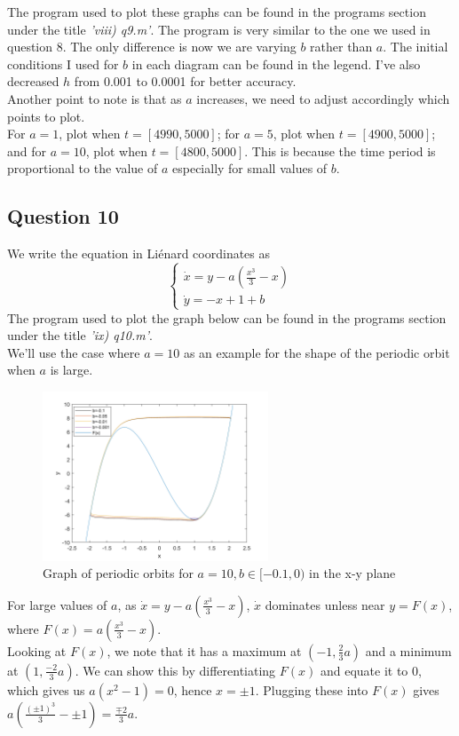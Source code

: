 \documentclass[10pt]{article}
\begin{document}
\noindent The program used to plot these graphs can be found in the programs section under the title \emph{'viii) q9.m'}. The program is very similar to the one we used in question 8. The only difference is now we are varying $b$ rather than $a$. The initial conditions I used for $b$ in each diagram can be found in the legend. I've also decreased $h$ from 0.001 to 0.0001 for better accuracy. \\
Another point to note is that as $a$ increases, we need to adjust accordingly which points to plot.\\
For $a=1$, plot when $t=[4990,5000]$; for $a=5$, plot when $t=[4900,5000]$; and for $a=10$, plot when $t=[4800,5000]$. This is because the time period is proportional to the value of $a$ especially for small values of $b$.

\subsection*{Question 10}
We write the equation in Li\'{e}nard coordinates as 
\[\left
\{\begin{array}{lr}
\dot{x}= y-a(\frac{x^3}{3}-x)\\
\dot{y}= -x+1+b
\end{array}
\right.
\]
The program used to plot the graph below can be found in the programs section under the title \emph{'ix) q10.m'}.\\
We'll use the case where $a=10$ as an example for the shape of the periodic orbit when $a$ is large.
\begin{figure}[H]
\centering
\includegraphics[width=0.6\textwidth]{Files/q10,a=10.png}
\caption{Graph of periodic orbits for $a=10, b\in[-0.1,0)$ in the x-y plane}
\end{figure}
\noindent For large values of $a$, as $\dot{x}=y-a(\frac{x^3}{3}-x)$, $\dot{x}$ dominates unless near $y=F(x)$, where $F(x)=a(\frac{x^3}{3}-x)$.\\
Looking at $F(x)$, we note that it has a maximum at $(-1,\frac{2}{3}a)$ and a minimum at $(1,\frac{-2}{3}a)$. We can show this by differentiating $F(x)$ and equate it to 0, which gives us $a(x^2-1)=0$, hence $x=\pm1$. Plugging these into $F(x)$ gives $a(\frac{(\pm1)^3}{3}-\pm1)=\frac{\mp2}{3}a$.\\
\end{document}
